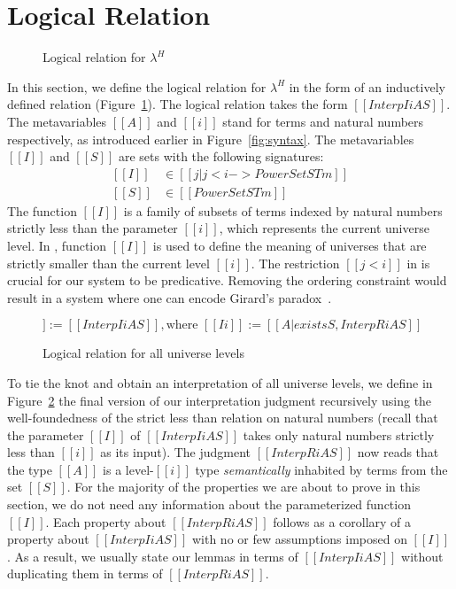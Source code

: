 \documentclass[nonacm]{acmart}
\newcommand{\lang}{$\lambda^H$\xspace}
\begin{document}
\section{Logical Relation}
\label{sec:logreldep}
\begin{figure}[h]
\caption{Logical relation for \lang}
\label{fig:logrel}
\end{figure}
In this section, we define the logical relation for \lang{} in the
form of an inductively defined relation (Figure~\ref{fig:logrel}). The
logical relation takes the form $[[Interp I i A S]]$. The
metavariables $[[A]]$ and $[[i]]$ stand for terms and natural
numbers respectively, as introduced earlier in
Figure~\ref{fig:syntax}.
The metavariables $[[I]]$ and $[[S]]$ are
sets with the following signatures:
\begin{equation*}
  \begin{split}
    [[I]] &\in [[ { j | j < i  } ->  PowerSet STm ]] \\
    [[S]] &\in [[PowerSet STm]]
  \end{split}
\end{equation*}
The function $[[I]]$ is a family of subsets of terms indexed by
natural numbers strictly less than the parameter $[[i]]$, which
represents the current universe level.  In , function
$[[I]]$ is used to define the meaning of
universes that are strictly smaller than the current level $[[i]]$. The
restriction $[[j < i]]$ in  is crucial for our system to
be predicative. Removing the ordering constraint would result in a
system where one can encode Girard's paradox~\citep{girard-thesis}.

\begin{figure}[h]
\begin{equation*}
    [[InterpR i A S]] := [[ Interp I i A S  ]], \text{where } [[I i]] := [[{A | exists S , InterpR i A S}]]
\end{equation*}
\caption{Logical relation for all universe levels}
\label{fig:logrelrec}
\end{figure}
To tie the knot and obtain an interpretation of all universe levels,
we define in Figure~\ref{fig:logrelrec} the final version of our interpretation judgment recursively
using the well-foundedness of the strict less than relation on natural
numbers (recall that
the parameter $[[I]]$ of $[[Interp I i A S]]$ takes only natural
numbers strictly less than $[[i]]$ as its input).
The judgment $[[InterpR i A S]]$ now reads that the type $[[A]]$ is a
level-$[[i]]$ type \emph{semantically} inhabited by terms from the set
$[[S]]$. For the
majority of the properties we are about to prove in this section, we
do not need any information about the parameterized function $[[I]]$.
Each property about $[[InterpR i A S]]$ follows as a corollary of
a property about $[[Interp I i A S]]$ with no or few assumptions imposed on
$[[I]]$. As a result, we usually state our lemmas in terms of
$[[Interp I i A S]]$ without duplicating them in terms of $[[InterpR i
A S]]$.
\end{document}
